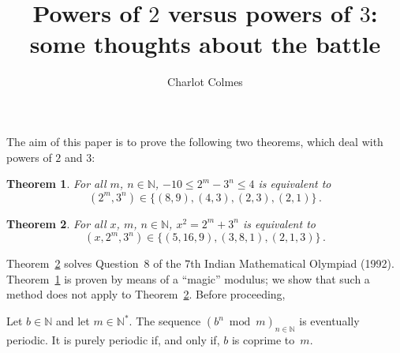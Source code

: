 \documentclass[12pt]{article}
\newcommand{\bZ}{\mathbb{Z}}
\newcommand{\bN}{\mathbb{N}} %
\newcommand{\bNast}{\bN^*}
\newtheorem{theorem}{Theorem}
\theoremstyle{definition}
\begin{document}
 \title{Powers of $2$ versus powers of $3$: some thoughts about the battle}
 \author{Charlot Colmes}
 \maketitle 


 The aim of this paper is to prove the following two theorems, which deal with powers of $2$ and $3$:

   \begin{theorem} \label{thm:2m-moins-3n}
     For all $m$, $n \in \bN$,
     $- 10 \le 2^m - 3^n  \le 4$ is equivalent to
     $$(2^m, 3^n) \in \{ (8, 9), (4, 3), (2, 3), (2, 1)  \} \, .
     $$
   \end{theorem}

   
   \begin{theorem} \label{thm:IndMO}
     For all $x$, $m$, $n \in \bN$,
     $x^2 = 2^m + 3^n$ is equivalent to
     $$
     (x, 2^m, 3^n) \in \{  (5, 16, 9), (3, 8, 1), (2, 1, 3) \} \, .
     $$
   \end{theorem}

   Theorem~\ref{thm:IndMO} solves Question~$8$ of the $7$th Indian Mathematical Olympiad (1992).
   Theorem~\ref{thm:2m-moins-3n} is proven by means of a ``magic'' modulus;
   we show that such a method does not apply to Theorem~\ref{thm:IndMO}. 
   Before proceeding,

   Let $b \in \bN$ and let $m \in \bNast$.
   The sequence $\left( b^n \bmod m \right)_{n \in \bN}$ is eventually periodic.
   It is purely periodic if, and only if, $b$ is coprime to~$m$.
   
\end{document}
